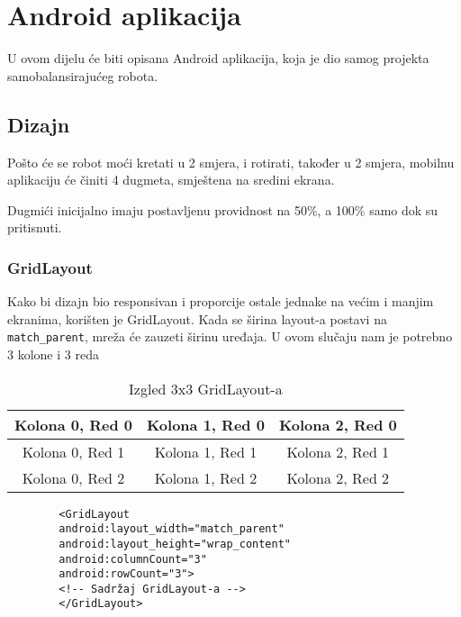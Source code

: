 \documentclass[../Document.tex]{subfiles}
\begin{document}
\section{Android aplikacija}
U ovom dijelu će biti opisana Android aplikacija, koja je dio samog projekta samobalansirajućeg robota.

\subsection{Dizajn}
Pošto će se robot moći kretati u 2 smjera, i rotirati, također u 2 smjera, mobilnu aplikaciju će činiti 4 dugmeta, smještena na sredini ekrana.


\noindent Dugmići inicijalno imaju postavljenu providnost na 50\%, a 100\% samo dok su pritisnuti.

\subsubsection{GridLayout}
Kako bi dizajn bio responsivan i proporcije ostale jednake na većim i manjim ekranima, korišten je GridLayout. Kada se širina layout-a postavi na \verb|match_parent|, mreža će zauzeti širinu uređaja. U ovom slučaju nam je potrebno 3 kolone i 3 reda

\begin{table}[h]
    \centering
    \def\arraystretch{2}
    \begin{tabular}{ |c|c|c| }
        \hline
        Kolona 0, Red 0 & Kolona 1, Red 0 & Kolona 2, Red 0 \\
        \hline
        Kolona 0, Red 1 & Kolona 1, Red 1 & Kolona 2, Red 1 \\
        \hline
        Kolona 0, Red 2 & Kolona 1, Red 2 & Kolona 2, Red 2 \\
        \hline
    \end{tabular}
    \caption{Izgled 3x3 GridLayout-a}
\end{table}

\begin{code}
    \begin{verbatim}
        <GridLayout
        android:layout_width="match_parent"
        android:layout_height="wrap_content"
        android:columnCount="3"
        android:rowCount="3">
        <!-- Sadržaj GridLayout-a -->
        </GridLayout>
    \end{verbatim}
    \caption{GridLayout}
\end{code}
\end{document}
